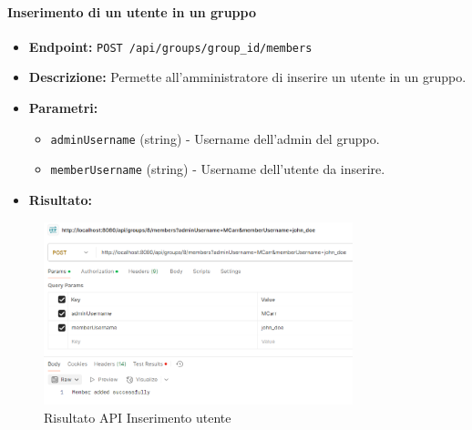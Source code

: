 \paragraph{Inserimento di un utente in un gruppo}
\begin{itemize}
    \item \textbf{Endpoint:} \texttt{POST /api/groups/{group\_id}/members}
    \item \textbf{Descrizione:} Permette all'amministratore di inserire un utente in un gruppo.
    \item \textbf{Parametri:}
    \begin{itemize}
        \item \texttt{adminUsername} (string) - Username dell'admin del gruppo.
        \item \texttt{memberUsername} (string) - Username dell'utente da inserire.
    \end{itemize}
    \item \textbf{Risultato:}
\end{itemize}
\begin{figure}[H]
    \centering
    \includegraphics[width=0.8\textwidth]{images/AddMemberAPI.png}
    \caption{Risultato API Inserimento utente}
    \label{fig:api_add_member}
\end{figure}

